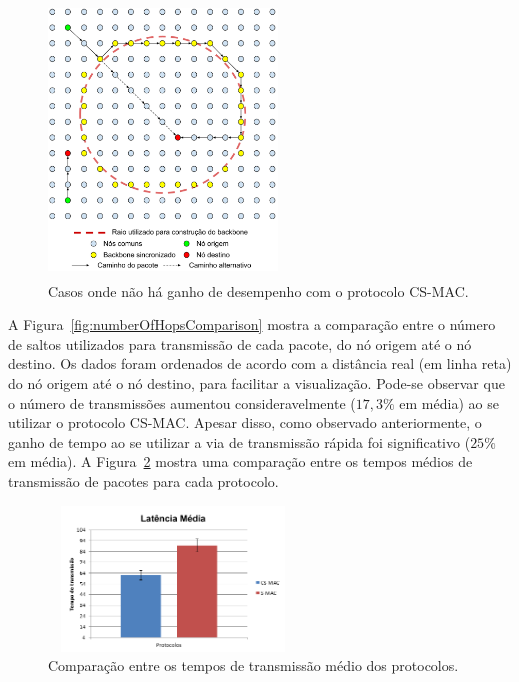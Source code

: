 \begin{figure}[!htb]
\centering
\includegraphics[width=230px,height=275px]{./Pictures/BackboneExceptions.png}
\caption{Casos onde não há ganho de desempenho com o protocolo CS-MAC.} %
\label{fig:backboneExceptions} %
\end{figure}

A Figura~\ref{fig:numberOfHopsComparison} mostra a comparação entre o número de saltos utilizados para transmissão de cada pacote, do nó origem até o nó destino. Os dados foram ordenados de acordo com a distância real (em linha reta) do nó origem até o nó destino, para facilitar a visualização. Pode-se observar que o número de transmissões aumentou consideravelmente ($17,3\%$ em média) ao se utilizar o protocolo CS-MAC. Apesar disso, como observado anteriormente, o ganho de tempo ao se utilizar a via de transmissão rápida foi significativo ($25\%$ em média). A Figura~\ref{fig:averageTransmissionTime} mostra uma comparação entre os tempos médios de transmissão de pacotes para cada protocolo.


\begin{figure}[!htb]
\centering
\includegraphics[width=250px,height=146px]{./Pictures/AverageTransmissionTime.png}
\caption{Comparação entre os tempos de transmissão médio dos protocolos.} %
\label{fig:averageTransmissionTime} %
\end{figure}

